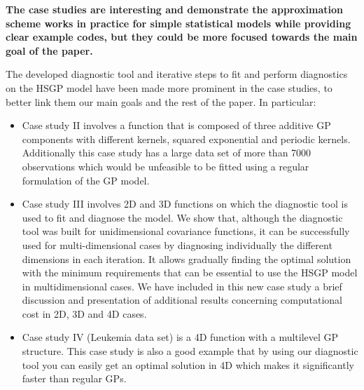 \documentclass[11pt]{report}
\begin{document}
\textbf{The case studies are interesting and demonstrate the approximation scheme works in practice for simple statistical models while providing clear example codes, but they could be more focused towards the main goal of the paper.}

The developed diagnostic tool and iterative steps to fit and perform diagnostics on the HSGP model have been made more prominent in the case studies, to better link them our main goals and the rest of the paper. In particular:


\begin{itemize}

\item Case study II involves a function that is composed of three additive GP components with different kernels, squared exponential and periodic kernels. Additionally this case study has a large data set of more than 7000 observations which would be unfeasible to be fitted using a regular formulation of the GP model.

\item Case study III involves 2D and 3D functions on which the diagnostic tool is used to fit and diagnose the model. We show that, although the diagnostic tool was built for unidimensional covariance functions, it can be successfully used for multi-dimensional cases by diagnosing individually the different dimensions in each iteration. It allows gradually finding the optimal solution with the minimum requirements that can be essential to use the HSGP model in multidimensional cases. We have included in this new case study a brief discussion and presentation of additional results concerning computational cost in 2D, 3D and 4D cases.

\item Case study IV (Leukemia data set) is a 4D function with a multilevel GP structure. This case study is also a good example that by using our diagnostic tool you can easily get an optimal solution in 4D which makes it significantly faster than regular GPs.
\end{itemize}
\end{document}
